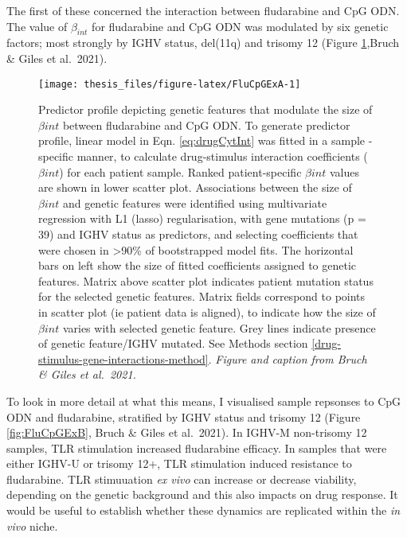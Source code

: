 \documentclass[11pt, a4paper, twosided]{book}
\begin{document}
The first of these concerned the interaction between fludarabine and CpG ODN. The value of \(\beta_{int}\) for fludarabine and CpG ODN was modulated by six genetic factors; most strongly by IGHV status, del(11q) and trisomy 12 (Figure \ref{fig:FluCpGExA},Bruch \& Giles et al.~2021).


\begin{figure}

{\centering \texttt{[image: thesis\_files/figure-latex/FluCpGExA-1]} 

}

\caption{Predictor profile depicting genetic features that modulate the size of \(\beta{int}\) between fludarabine and CpG ODN. To generate predictor profile, linear model in Eqn. \eqref{eq:drugCytInt} was fitted in a sample - specific manner, to calculate drug-stimulus interaction coefficients (\(\beta{int}\)) for each patient sample. Ranked patient-specific \(\beta{int}\) values are shown in lower scatter plot. Associations between the size of \(\beta{int}\) and genetic features were identified using multivariate regression with L1 (lasso) regularisation, with gene mutations (p = 39) and IGHV status as predictors, and selecting coefficients that were chosen in \textgreater90\% of bootstrapped model fits. The horizontal bars on left show the size of fitted coefficients assigned to genetic features. Matrix above scatter plot indicates patient mutation status for the selected genetic features. Matrix fields correspond to points in scatter plot (ie patient data is aligned), to indicate how the size of \(\beta{int}\) varies with selected genetic feature. Grey lines indicate presence of genetic feature/IGHV mutated. See Methods section \ref{drug-stimulus-gene-interactions-method}. \emph{Figure and caption from Bruch \& Giles et al.~2021.}}\label{fig:FluCpGExA}
\end{figure}
To look in more detail at what this means, I visualised sample repsonses to CpG ODN and fludarabine, stratified by IGHV status and trisomy 12 (Figure \ref{fig:FluCpGExB}, Bruch \& Giles et al.~2021). In IGHV-M non-trisomy 12 samples, TLR stimulation increased fludarabine efficacy. In samples that were either IGHV-U or trisomy 12+, TLR stimulation induced resistance to fludarabine. TLR stimuuation \emph{ex vivo} can increase or decrease viability, depending on the genetic background and this also impacts on drug response. It would be useful to establish whether these dynamics are replicated within the \emph{in vivo} niche.
\end{document}
